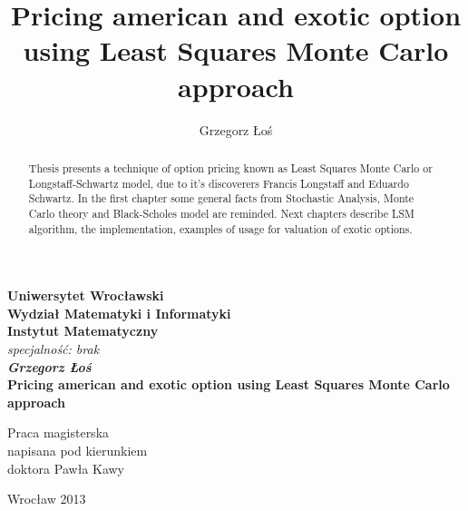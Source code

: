 \documentclass[a4paper,12pt, twoside]{article}
\title{Pricing american and exotic option using Least Squares Monte Carlo approach}
\author{Grzegorz Łoś}
\theoremstyle{definition}
\theoremstyle{remark}
\begin{document}
 
\newpage
\thispagestyle{empty}
\begin{center}
\textbf{\large Uniwersytet Wrocławski\\
Wydział Matematyki i Informatyki\\
Instytut Matematyczny}\\
\textit{\large specjalność: brak}\\
\vspace{4cm}
\textbf{\textit{\large Grzegorz Łoś}\\
\vspace{0.5cm}
{\Large Pricing american and exotic option using Least Squares Monte Carlo approach}}\\
\end{center}
\vspace{3cm}
{\hspace*{6.5cm}\large Praca magisterska\\
\hspace*{6.5cm}\large  napisana pod kierunkiem\\
\hspace*{6.5cm}\large  doktora Pawła Kawy }
\vfill
\begin{center}
{\large Wrocław 2013}\\
\end{center}

\newpage
\thispagestyle{empty}
\vspace*{10cm}

\newpage

\tableofcontents

\newpage

\begin{abstract}
  Thesis presents a technique of option pricing known as Least Squares Monte Carlo or Longstaff-Schwartz model, due to it's discoverers Francis Longstaff and Eduardo Schwartz. In the first chapter some general facts from Stochastic Analysis, Monte Carlo theory and Black-Scholes model are reminded. Next chapters describe LSM algorithm, the implementation, examples of usage for valuation of exotic options.
\end{abstract}
\end{document}
